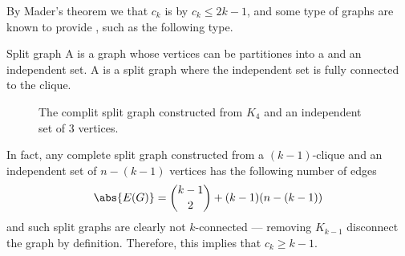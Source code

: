 \documentclass[a4paper, 12pt]{report}
\begin{document}
    By Mader's theorem we that $c_k$ is  by $c_k \le 2k - 1$, and some type of graphs are known to provide , such as the following type.

    \begin{frameddefn}{Split graph}
        A  is a graph whose vertices can be partitiones into a  and an independent set. A  is a split graph where the independent set is fully connected to the clique.
    \end{frameddefn}

    \begin{figure}[H]
        \centering
        \caption{The complit split graph constructed from $K_4$ and an independent set of 3 vertices.}
    \end{figure}

    In fact, any complete split graph constructed from a $(k - 1)$-clique and an independent set of $n - (k - 1)$ vertices has the following number of edges $$\abs{E(G)} = \binom{k - 1}{2} +  (k - 1)(n - (k - 1))$$ and such split graphs are clearly not $k$-connected --- removing $K_{k - 1}$ disconnect the graph by definition. Therefore, this implies that $c_k \ge k - 1$.
\end{document}
